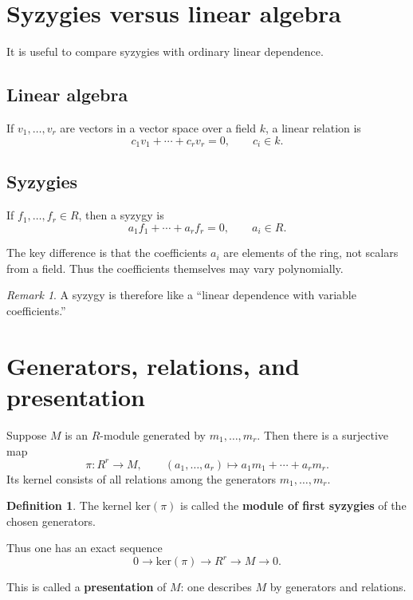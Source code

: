 \documentclass[11pt]{article}
\theoremstyle{definition}
\newtheorem{definition}[theorem]{Definition}
\theoremstyle{remark}
\newtheorem{remark}[theorem]{Remark}
\newcommand{\kerR}{\mathrm{ker}}
\begin{document}
	\section{Syzygies versus linear algebra}
	
	It is useful to compare syzygies with ordinary linear dependence.
	
	\subsection{Linear algebra}
	
	If \(v_1,\dots,v_r\) are vectors in a vector space over a field \(k\), a linear relation is
	\[
	c_1v_1+\cdots+c_rv_r=0,\qquad c_i\in k.
	\]
	
	\subsection{Syzygies}
	
	If \(f_1,\dots,f_r\in R\), then a syzygy is
	\[
	a_1f_1+\cdots+a_rf_r=0,\qquad a_i\in R.
	\]
	
	The key difference is that the coefficients \(a_i\) are elements of the ring, not scalars from a field. Thus the coefficients themselves may vary polynomially.
	
	\begin{remark}
		A syzygy is therefore like a ``linear dependence with variable coefficients.''
	\end{remark}
	
	\section{Generators, relations, and presentation}
	
	Suppose \(M\) is an \(R\)-module generated by \(m_1,\dots,m_r\). Then there is a surjective map
	\[
	\pi:R^r\to M,\qquad
	(a_1,\dots,a_r)\mapsto a_1m_1+\cdots+a_rm_r.
	\]
	Its kernel consists of all relations among the generators \(m_1,\dots,m_r\).
	
	\begin{definition}
		The kernel \(\kerR(\pi)\) is called the \textbf{module of first syzygies} of the chosen generators.
	\end{definition}
	
	Thus one has an exact sequence
	\[
	0\to \kerR(\pi)\to R^r\to M\to 0.
	\]
	
	This is called a \textbf{presentation} of \(M\): one describes \(M\) by generators and relations.
	
\end{document}
